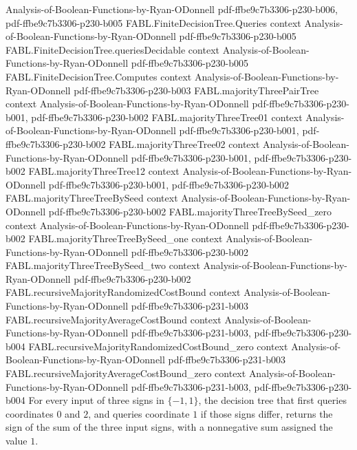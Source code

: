 \begin{theorem}
  {Analysis-of-Boolean-Functions-by-Ryan-ODonnell}
  {pdf-ffbe9c7b3306-p230-b006,
    pdf-ffbe9c7b3306-p230-b005}
\proofstep
  {FABL.FiniteDecisionTree.Queries}
  {context}
  {Analysis-of-Boolean-Functions-by-Ryan-ODonnell}
  {pdf-ffbe9c7b3306-p230-b005}
\proofstep
  {FABL.FiniteDecisionTree.queriesDecidable}
  {context}
  {Analysis-of-Boolean-Functions-by-Ryan-ODonnell}
  {pdf-ffbe9c7b3306-p230-b005}
\proofstep
  {FABL.FiniteDecisionTree.Computes}
  {context}
  {Analysis-of-Boolean-Functions-by-Ryan-ODonnell}
  {pdf-ffbe9c7b3306-p230-b003}
\proofstep
  {FABL.majorityThreePairTree}
  {context}
  {Analysis-of-Boolean-Functions-by-Ryan-ODonnell}
  {pdf-ffbe9c7b3306-p230-b001,
    pdf-ffbe9c7b3306-p230-b002}
\proofstep
  {FABL.majorityThreeTree01}
  {context}
  {Analysis-of-Boolean-Functions-by-Ryan-ODonnell}
  {pdf-ffbe9c7b3306-p230-b001,
    pdf-ffbe9c7b3306-p230-b002}
\proofstep
  {FABL.majorityThreeTree02}
  {context}
  {Analysis-of-Boolean-Functions-by-Ryan-ODonnell}
  {pdf-ffbe9c7b3306-p230-b001,
    pdf-ffbe9c7b3306-p230-b002}
\proofstep
  {FABL.majorityThreeTree12}
  {context}
  {Analysis-of-Boolean-Functions-by-Ryan-ODonnell}
  {pdf-ffbe9c7b3306-p230-b001,
    pdf-ffbe9c7b3306-p230-b002}
\proofstep
  {FABL.majorityThreeTreeBySeed}
  {context}
  {Analysis-of-Boolean-Functions-by-Ryan-ODonnell}
  {pdf-ffbe9c7b3306-p230-b002}
\proofstep
  {FABL.majorityThreeTreeBySeed_zero}
  {context}
  {Analysis-of-Boolean-Functions-by-Ryan-ODonnell}
  {pdf-ffbe9c7b3306-p230-b002}
\proofstep
  {FABL.majorityThreeTreeBySeed_one}
  {context}
  {Analysis-of-Boolean-Functions-by-Ryan-ODonnell}
  {pdf-ffbe9c7b3306-p230-b002}
\proofstep
  {FABL.majorityThreeTreeBySeed_two}
  {context}
  {Analysis-of-Boolean-Functions-by-Ryan-ODonnell}
  {pdf-ffbe9c7b3306-p230-b002}
\proofstep
  {FABL.recursiveMajorityRandomizedCostBound}
  {context}
  {Analysis-of-Boolean-Functions-by-Ryan-ODonnell}
  {pdf-ffbe9c7b3306-p231-b003}
\proofstep
  {FABL.recursiveMajorityAverageCostBound}
  {context}
  {Analysis-of-Boolean-Functions-by-Ryan-ODonnell}
  {pdf-ffbe9c7b3306-p231-b003,
    pdf-ffbe9c7b3306-p230-b004}
\proofstep
  {FABL.recursiveMajorityRandomizedCostBound_zero}
  {context}
  {Analysis-of-Boolean-Functions-by-Ryan-ODonnell}
  {pdf-ffbe9c7b3306-p231-b003}
\proofstep
  {FABL.recursiveMajorityAverageCostBound_zero}
  {context}
  {Analysis-of-Boolean-Functions-by-Ryan-ODonnell}
  {pdf-ffbe9c7b3306-p231-b003,
    pdf-ffbe9c7b3306-p230-b004}
For every input of three signs in $\{-1,1\}$, the decision tree that first queries
coordinates $0$ and $2$, and queries coordinate $1$ if those signs differ, returns the
sign of the sum of the three input signs, with a nonnegative sum assigned the value $1$.
\end{theorem}

